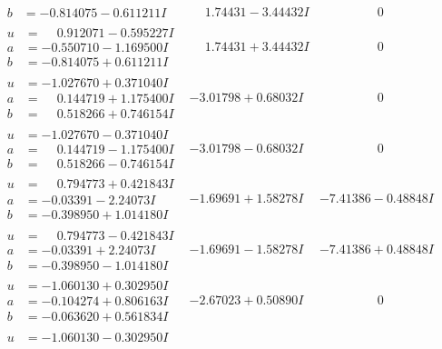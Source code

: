\documentclass[1p]{elsarticle_modified}
\theoremstyle{definition}
\begin{document}
$$\begin{array}{c|c|c}
\begin{aligned}
b &= -0.814075 - 0.611211 I\end{aligned}
 & \phantom{-}1.74431 - 3.44432 I & \phantom{-0.000000 } 0 \\ \hline\begin{aligned}
u &= \phantom{-}0.912071 - 0.595227 I \\
a &= -0.550710 - 1.169500 I \\
b &= -0.814075 + 0.611211 I\end{aligned}
 & \phantom{-}1.74431 + 3.44432 I & \phantom{-0.000000 } 0 \\ \hline\begin{aligned}
u &= -1.027670 + 0.371040 I \\
a &= \phantom{-}0.144719 + 1.175400 I \\
b &= \phantom{-}0.518266 + 0.746154 I\end{aligned}
 & -3.01798 + 0.68032 I & \phantom{-0.000000 } 0 \\ \hline\begin{aligned}
u &= -1.027670 - 0.371040 I \\
a &= \phantom{-}0.144719 - 1.175400 I \\
b &= \phantom{-}0.518266 - 0.746154 I\end{aligned}
 & -3.01798 - 0.68032 I & \phantom{-0.000000 } 0 \\ \hline\begin{aligned}
u &= \phantom{-}0.794773 + 0.421843 I \\
a &= -0.03391 - 2.24073 I \\
b &= -0.398950 + 1.014180 I\end{aligned}
 & -1.69691 + 1.58278 I & -7.41386 - 0.48848 I \\ \hline\begin{aligned}
u &= \phantom{-}0.794773 - 0.421843 I \\
a &= -0.03391 + 2.24073 I \\
b &= -0.398950 - 1.014180 I\end{aligned}
 & -1.69691 - 1.58278 I & -7.41386 + 0.48848 I \\ \hline\begin{aligned}
u &= -1.060130 + 0.302950 I \\
a &= -0.104274 + 0.806163 I \\
b &= -0.063620 + 0.561834 I\end{aligned}
 & -2.67023 + 0.50890 I & \phantom{-0.000000 } 0 \\ \hline\begin{aligned}
u &= -1.060130 - 0.302950 I \\

\end{aligned}
\end{array}$$
\end{document}
